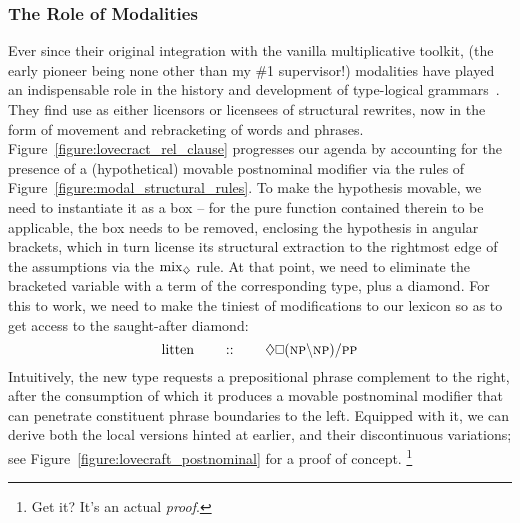 \subsubsection{The Role of Modalities}
Ever since their original integration with the vanilla multiplicative toolkit, (the early pioneer being none other than my \#1 supervisor!) modalities have played an indispensable role in the history and development of type-logical grammars~\cite{hendriks1995ellipsis, moortgat1996multimodal,kurtonina1997structural,moortgat1997categorial,vermaat1999controlling}.
They find use as either licensors or licensees of structural rewrites, now in the form of movement and rebracketing of words and phrases.
Figure~\ref{figure:lovecract_rel_clause} progresses our agenda by accounting for the presence of a (hypothetical) movable postnominal modifier via the rules of Figure~\ref{figure:modal_structural_rules}.
To make the hypothesis movable, we need to instantiate it as a box -- for the pure function contained therein to be applicable, the box needs to be removed, enclosing the hypothesis in angular brackets, which in turn license its structural extraction to the rightmost edge of the assumptions via the $\rulestyle{mix}_{\diamond}$ rule.
At that point, we need to eliminate the bracketed variable with a term of the corresponding type, plus a diamond.
For this to work, we need to make the tiniest of modifications to our lexicon so as to get access to the saught-after diamond:
\begin{equation}\label{equation:litten}
	\w{litten} \qquad :: \qquad \diamond\bx (\np[s]\divleft\np[s])\divright\pp[s]
\end{equation}
Intuitively, the new type requests a prepositional phrase complement to the right, after the consumption of which it produces a movable postnominal modifier that can penetrate constituent phrase boundaries to the left.
Equipped with it, we can derive both the local versions hinted at earlier, and their discontinuous variations; see Figure~\ref{figure:lovecraft_postnominal} for a proof of concept.%
\footnote{Get it? It's an actual \textit{proof}.} 

